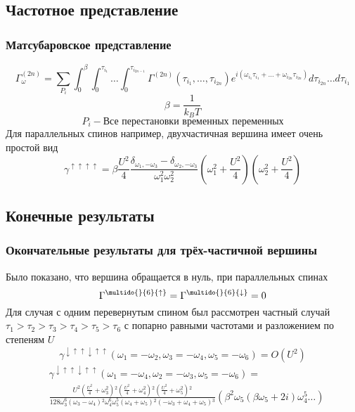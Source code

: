 \documentclass{beamer}
\begin{document}
\subsection{Частотное представление}
\begin{frame}
 \frametitle{Матсубаровское представление}
 \pause
 \scriptsize\[ \Gamma_\omega^{(2n)} = \sum_{P_i} \int_0^\beta\int_0^{\tau_{i_1}}\dots\int_0^{\tau_{i_{2n-1}}}\Gamma^{(2n)}(\tau_{i_1},\dots,\tau_{i_{2n}})
  e^{i(\omega_{i_1}\tau_{i_1}+\dots+\omega_{i_{2n}}\tau_{i_{2n}})}d\tau_{i_{2n}}\dots d\tau_{i_1} \]
 \pause
 \[ \beta = \frac{1}{k_B T} \] \pause
 \[ P_i  - \text{Все перестановки временных переменных} \] \pause
 Для параллельных спинов например, двухчастичная вершина имеет очень простой вид
 \[ \gamma^{\uparrow\uparrow\uparrow\uparrow} = \beta \frac{U^2}{4}\frac{\delta_{\omega_1,-\omega_3}-\delta_{\omega_2,-\omega_3}}{\omega_1^2\omega_2^2}
  (\omega_1^2+\frac{U^2}{4})(\omega_2^2+\frac{U^2}{4}) \]
\end{frame}

\subsection{Конечные результаты}
\begin{frame}
 \frametitle{Окончательные результаты для трёх-частичной вершины}\pause
 Было показано, что вершина обращается в нуль, при параллельных спинах
 \[ \Gamma^{\multido{}{6}{\uparrow}} = \Gamma^{\multido{}{6}{\downarrow}} = 0 \]\pause
 Для случая с одним перевернутым спином был рассмотрен частный случай $\tau_1>\tau_2>\tau_3>\tau_4>\tau_5>\tau_6$ с попарно равными частотами 
  и разложением по степеням $U$ \pause
 \[ \gamma^{\downarrow\uparrow\uparrow\downarrow\uparrow\uparrow}(\omega_1=-\omega_2,\omega_3=-\omega_4,\omega_5=-\omega_6) = O(U^2) \] \pause
 \tiny\begin{align*} & \gamma^{\downarrow\uparrow\uparrow\downarrow\uparrow\uparrow}(\omega_1=-\omega_4,\omega_2 =-\omega_3,\omega_5=-\omega_6) = \\
    & \frac{U^2 \left(\frac{U^2}{4}+\omega _3^2\right){}^2 \left(\frac{U^2}{4}+ \omega _4^2\right){}^2 \left(\frac{U^2}{4}+\omega _5^2\right){}^2 }
      {128 \omega _3^6 \left(\omega _3-\omega _4\right){}^2 \omega _4^6 \omega _5^5 \left(\omega _4+\omega _5\right){}^2 \left(-\omega
   _3+\omega _4+\omega _5\right){}^3} \left(\beta^2 \omega _5 \left(\beta  \omega _5+2 i\right) \omega _4^5 \dots \right) \end{align*}
\end{frame}
\end{document}
